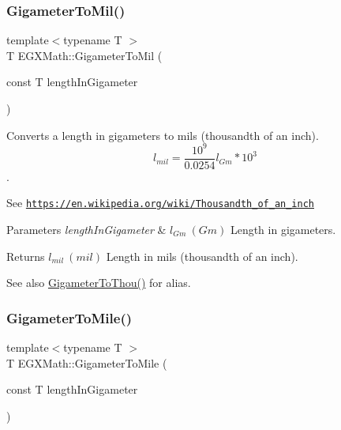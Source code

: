 \subsubsection{\texorpdfstring{Gigameter\+To\+Mil()}{GigameterToMil()}}
{\footnotesize\ttfamily template$<$typename T $>$ \\
T E\+G\+X\+Math\+::\+Gigameter\+To\+Mil (\begin{DoxyParamCaption}\item[{const T}]{length\+In\+Gigameter }\end{DoxyParamCaption})}



Converts a length in gigameters to mils (thousandth of an inch). \[ l_{mil}= \frac{10^{9}}{0.0254} l_{Gm} * 10^{3} \]. 

See \href{https://en.wikipedia.org/wiki/Thousandth_of_an_inch}{\tt https\+://en.\+wikipedia.\+org/wiki/\+Thousandth\+\_\+of\+\_\+an\+\_\+inch} 
\begin{DoxyParams}{Parameters}
{\em length\+In\+Gigameter} & $ l_{Gm}\ (Gm)$ Length in gigameters. \\
\hline
\end{DoxyParams}
\begin{DoxyReturn}{Returns}
$ l_{mil}\ (mil)$ Length in mils (thousandth of an inch). 
\end{DoxyReturn}
\begin{DoxySeeAlso}{See also}
\mbox{\hyperlink{group___e_g_x_math-_conversions-_length_conversions-_gigameter-_imperial_ga94fd906264f882396dc438a684e22b41}{Gigameter\+To\+Thou()}} for alias. 
\end{DoxySeeAlso}
\mbox{\label{group___e_g_x_math-_conversions-_length_conversions-_gigameter-_imperial_gab61b3324bc2080e5118924bffdd0d46d}} 
\subsubsection{\texorpdfstring{Gigameter\+To\+Mile()}{GigameterToMile()}}
{\footnotesize\ttfamily template$<$typename T $>$ \\
T E\+G\+X\+Math\+::\+Gigameter\+To\+Mile (\begin{DoxyParamCaption}\item[{const T}]{length\+In\+Gigameter }\end{DoxyParamCaption})}



